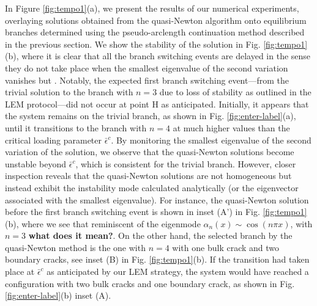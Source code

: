 

In Figure \ref{fig:tempo1}(a), we present the results of our numerical experiments, overlaying solutions obtained from the quasi-Newton algorithm onto equilibrium branches determined using the pseudo-arclength continuation method described in the previous section. We show the stability of the solution in  Fig. \ref{fig:tempo1}(b), where it is clear that all the branch switching events are delayed in the sense they do not  take place when the smallest eigenvalue of the second variation vanishes but . Notably, the expected first branch switching event—from the trivial solution to the branch with \(n=3\) due to loss of stability as outlined in the LEM protocol—did not occur at point H as anticipated. Initially, it appears that the system remains on the trivial branch, as shown in Fig. \ref{fig:enter-label}(a), until it transitions to the branch with \(n=4\) at much higher values than the critical loading parameter \(\bar{\epsilon}^c\). By monitoring the smallest eigenvalue of the second variation of the solution, we observe that the quasi-Newton solutions become unstable beyond \(\bar{\epsilon}^c\), which is consistent for the trivial branch. However, closer inspection reveals that the quasi-Newton solutions are not homogeneous but instead exhibit the instability mode calculated analytically (or  the eigenvector associated with the smallest eigenvalue). For instance, the  quasi-Newton solution before the first branch switching event is shown in inset (A') in Fig. \ref{fig:tempo1}(b), where we see that  reminiscent of the eigenmode \(\alpha_n(x) \sim \cos(n\pi x)\),  with \(n=3\) \textbf{what does it mean?}. On the other hand, the selected branch  by the quasi-Newton method is the one with \(n=4\) with one bulk crack and two boundary cracks, see inset (B) in Fig. \ref{fig:tempo1}(b). If the transition had taken place at \(\bar{\epsilon}^c\) as anticipated by our LEM strategy, the system would have reached a configuration with two bulk cracks and one boundary crack, as shown in Fig. \ref{fig:enter-label}(b) inset (A).

